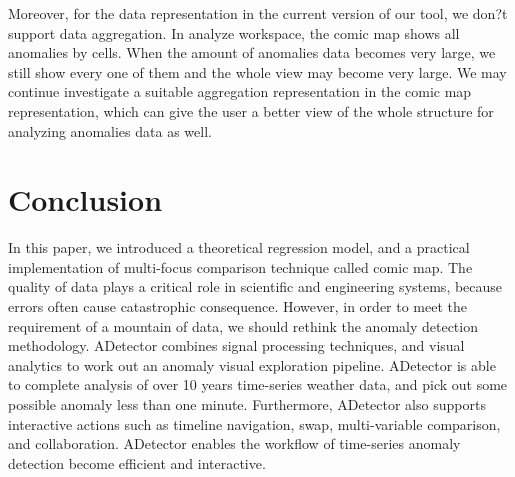 \documentclass{vgtc}                          %
\begin{document}
Moreover, for the data representation in the current version of our tool, we don?t support data aggregation. In analyze workspace, the comic map shows all anomalies by cells. When the amount of anomalies data becomes very large, we still show every one of them and the whole view may become very large. We may continue investigate a suitable aggregation representation in the comic map representation, which can give the user a better view of the whole structure for analyzing anomalies data as well.  
\section{Conclusion}

In this paper, we introduced a theoretical regression model, and a practical implementation of multi-focus comparison technique called comic map. The quality of data plays a critical role in scientific and engineering systems, because errors often cause catastrophic consequence. However, in order to meet the requirement of a mountain of data, we should rethink the anomaly detection methodology. ADetector combines signal processing techniques, and visual analytics to work out an anomaly visual exploration pipeline. ADetector is able to complete analysis of over 10 years time-series weather data, and pick out some possible anomaly less than one minute. Furthermore, ADetector also supports interactive actions such as timeline navigation, swap, multi-variable comparison, and collaboration. ADetector enables the workflow of time-series anomaly detection become efficient and interactive.





\end{document}
